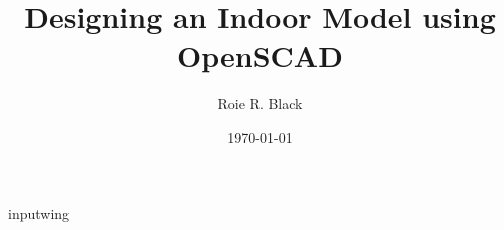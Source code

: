 \documentclass[10pt,twocolumn]{article}
\author{Roie R. Black}
\date{\today}
\title{Designing an Indoor Model using OpenSCAD}
\begin{document}
\maketitle





input{wing}









\tableofcontents

\end{document}
